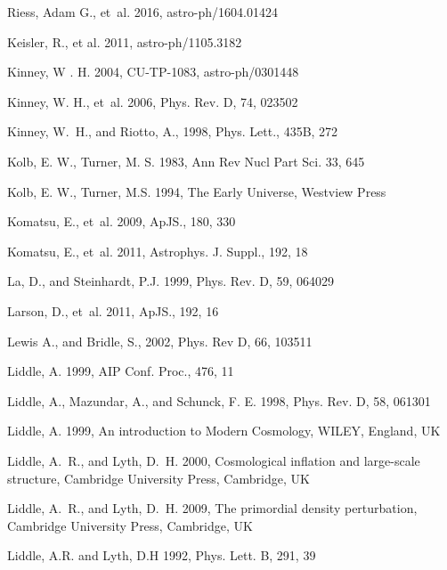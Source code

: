 \documentclass{rmaa}
\begin{document}
\begin{thebibliography}
Riess, Adam G., et~al. 2016,  astro-ph/1604.01424

  Keisler, R., et al. 2011, astro-ph/1105.3182  
 
  Kinney, W . H. 2004, CU-TP-1083, astro-ph/0301448
 
 Kinney, W. H.,  et~al. 2006, Phys. Rev. D, 74, 023502

 Kinney, W.~H., and {Riotto}, A.,  1998, Phys. Lett., 435B, 272

Kolb, E. W., Turner, M. S. 1983, Ann Rev Nucl Part Sci. 33, 645
  
Kolb, E. W., Turner, M.S. 1994, The Early Universe, Westview Press  

  Komatsu, E., et~al. 2009, ApJS., 180, 330 
  
Komatsu, E., et~al. 2011, Astrophys. J. Suppl., 192, 18

  La, D., and {Steinhardt}, P.J.  1999, Phys. Rev. D, 59, 064029
 
Larson, D., et~al. 2011, ApJS., 192, 16

Lewis A., and Bridle, S., 2002, Phys. Rev D, 66, 103511 
   
  Liddle, A. 1999, AIP Conf. Proc., 476, 11

 Liddle, A.,  {Mazundar,} A., and {Schunck,} F. E. 1998, Phys. Rev. D, 58, 061301  

Liddle, A. 1999, An introduction to Modern Cosmology, WILEY, England, UK

 Liddle, A.~R., and  Lyth, D.~H. 2000, Cosmological inflation and large-scale structure,
  Cambridge University Press, Cambridge, UK 

 Liddle, A.~R., and  Lyth, D.~H. 2009, The primordial density perturbation,
  Cambridge University Press, Cambridge, UK 
  
 Liddle, A.R. and Lyth, D.H 1992, Phys. Lett. B, 291, 39


\end{thebibliography}
\end{document}
